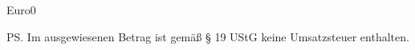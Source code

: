 \documentclass[DIN, paper=a4, pagesize=auto, pagenumber=botcenter, fontsize=11pt]{scrlttr2}
\begin{document}
	\begin{letter}{\customerCompany \\ \customerName \\ 
	\customerStreet \\ \customerZIP \ \customerCity}
	
			\opening{\invoiceSalutation}
			\invoiceText
		    \begin{invoice}{Euro}{0}
			    
		    \end{invoice}
		\ps Im ausgewiesenen Betrag ist gemäß § 19 UStG keine Umsatzsteuer 
		enthalten.

		\closing{\invoiceClosing}
		\invoiceEnclosures



	\end{letter}
\end{document}
